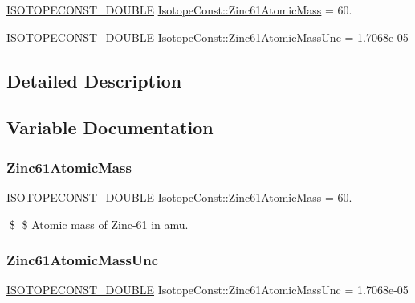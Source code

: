 \begin{DoxyCompactItemize}
\item 
\mbox{\hyperlink{group___isotope_const-_macros_ga8f45a7272ce02c0b4c65c44636ed719a}{I\+S\+O\+T\+O\+P\+E\+C\+O\+N\+S\+T\+\_\+\+D\+O\+U\+B\+LE}} \mbox{\hyperlink{group___isotope_const-_zinc-_zn61_ga0ef60f424d1ce3212a9694708fb654b1}{Isotope\+Const\+::\+Zinc61\+Atomic\+Mass}} = 60.
\item 
\mbox{\hyperlink{group___isotope_const-_macros_ga8f45a7272ce02c0b4c65c44636ed719a}{I\+S\+O\+T\+O\+P\+E\+C\+O\+N\+S\+T\+\_\+\+D\+O\+U\+B\+LE}} \mbox{\hyperlink{group___isotope_const-_zinc-_zn61_gacd3bb313a5a19f6686cb76f0c1895d83}{Isotope\+Const\+::\+Zinc61\+Atomic\+Mass\+Unc}} = 1.\+7068e-\/05
\end{DoxyCompactItemize}


\subsection{Detailed Description}


\subsection{Variable Documentation}
\mbox{\label{group___isotope_const-_zinc-_zn61_ga0ef60f424d1ce3212a9694708fb654b1}} 
\subsubsection{\texorpdfstring{Zinc61\+Atomic\+Mass}{Zinc61AtomicMass}}
{\footnotesize\ttfamily \mbox{\hyperlink{group___isotope_const-_macros_ga8f45a7272ce02c0b4c65c44636ed719a}{I\+S\+O\+T\+O\+P\+E\+C\+O\+N\+S\+T\+\_\+\+D\+O\+U\+B\+LE}} Isotope\+Const\+::\+Zinc61\+Atomic\+Mass = 60.}

\$ \$ Atomic mass of Zinc-\/61 in amu. \mbox{\label{group___isotope_const-_zinc-_zn61_gacd3bb313a5a19f6686cb76f0c1895d83}} 
\subsubsection{\texorpdfstring{Zinc61\+Atomic\+Mass\+Unc}{Zinc61AtomicMassUnc}}
{\footnotesize\ttfamily \mbox{\hyperlink{group___isotope_const-_macros_ga8f45a7272ce02c0b4c65c44636ed719a}{I\+S\+O\+T\+O\+P\+E\+C\+O\+N\+S\+T\+\_\+\+D\+O\+U\+B\+LE}} Isotope\+Const\+::\+Zinc61\+Atomic\+Mass\+Unc = 1.\+7068e-\/05}

